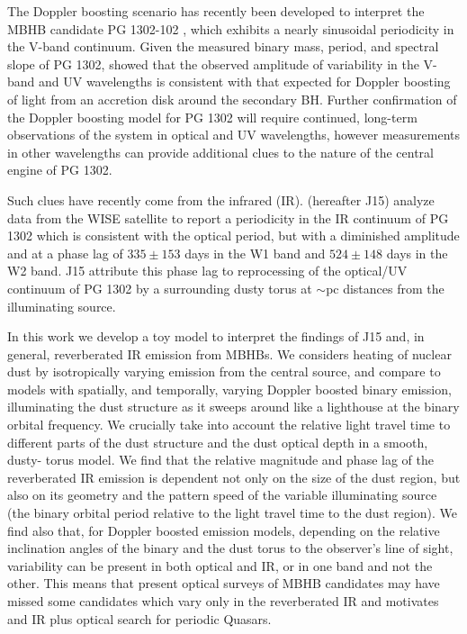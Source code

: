 The Doppler boosting scenario has recently been developed to interpret the
MBHB candidate PG 1302-102 \citep{Graham+2015a}, which exhibits a nearly
sinusoidal periodicity in the V-band continuum. Given the measured binary
mass, period, and spectral slope of PG 1302, \cite{PG1302Nature:2015b} showed
that the observed amplitude of variability in the V-band and UV wavelengths is
consistent with that expected for Doppler boosting of light from an accretion
disk around the secondary BH. Further confirmation of the Doppler boosting
model for PG 1302 will require continued, long-term observations of the system
in optical and UV wavelengths, however measurements in other wavelengths can
provide additional clues to the nature of the central engine of PG 1302.

Such clues have recently come from the infrared (IR). \cite{Jun:2015}
(hereafter J15) analyze data from the WISE satellite to report a periodicity
in the IR continuum of PG 1302 which is consistent with the optical period,
but with a diminished amplitude and at a phase lag of $335 \pm 153$ days in
the W1 band and $524 \pm 148$ days in the W2 band. J15 attribute this phase
lag to reprocessing of the optical/UV continuum of PG 1302 by a surrounding
dusty torus at $\sim$pc distances from the illuminating source.

In this work we develop a toy model to interpret the findings of J15 and, in
general, reverberated IR emission from MBHBs. We considers heating of  nuclear
dust by isotropically varying emission from the central source, and compare to
models with spatially, and temporally, varying Doppler boosted binary
emission, illuminating the dust structure as it sweeps around like a
lighthouse at the binary orbital frequency. We crucially take into account the
relative light travel time to different parts of the dust structure and the
dust optical depth in a smooth, dusty- torus model. We find that the relative
magnitude and phase lag of the reverberated IR emission is dependent not only
on the size of the dust region, but also on its geometry and the pattern speed
of the variable illuminating source (the binary orbital period relative to the
light travel time to the dust region). We find also that, for Doppler boosted
emission models, depending on the relative inclination angles of the binary
and the dust torus to the observer's line of sight, variability can be present
in both optical and IR, or in one band and not the other. This means that
present optical surveys of MBHB candidates may have missed some candidates
which vary only in the reverberated IR and motivates and IR plus optical
search for periodic Quasars.

